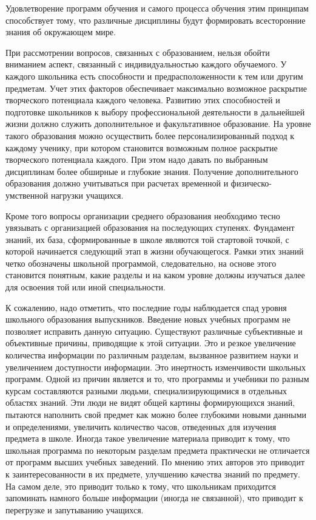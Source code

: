 Удовлетворение программ обучения и самого процесса обучения этим принципам способствует тому, что различные дисциплины будут формировать всесторонние знания об окружающем мире.

При рассмотрении вопросов, связанных с образованием, нельзя обойти вниманием аспект, связанный с индивидуальностью каждого обучаемого. У каждого школьника есть способности и предрасположенности к тем или другим предметам. Учет этих факторов обеспечивает максимально возможное раскрытие творческого потенциала каждого человека. Развитию этих способностей и подготовке школьников к выбору профессиональной деятельности в дальнейшей жизни должно служить дополнительное и факультативное образование. На уровне такого образования можно осуществить более персонализированный подход к каждому ученику, при котором становится возможным полное раскрытие творческого потенциала каждого. При этом надо давать по выбранным дисциплинам более обширные и глубокие знания. Получение дополнительного образования должно учитываться при расчетах временной и физическо-умственной нагрузки учащихся.

Кроме того вопросы организации среднего образования необходимо тесно увязывать с организацией образования на последующих ступенях. Фундамент знаний, их база, сформированные в школе являются той стартовой точкой, с которой начинается следующий этап в жизни обучающегося. Рамки этих знаний четко обозначены школьной программой, следовательно, на основе этого становится понятным, какие разделы и на каком уровне должны изучаться далее для освоения той или иной специальности.

К сожалению, надо отметить, что последние годы наблюдается спад уровня школьного образования выпускников. Введение новых учебных программ не позволяет исправить данную ситуацию. Существуют различные субъективные и объективные причины, приводящие к этой ситуации. Это и резкое увеличение количества информации по различным разделам, вызванное развитием науки и увеличением доступности информации. Это инертность изменчивости школьных программ. Одной из причин является и то, что программы и учебники по разным курсам составляются разными людьми, специализирующимися в отдельных областях знаний. Эти люди не видят общей картины формирующихся знаний, пытаются наполнить свой предмет как можно более глубокими новыми данными и определениями, увеличить количество часов, отведенных для изучения предмета в школе. Иногда такое увеличение материала приводит к тому, что школьная программа по некоторым разделам предмета практически не отличается от программ высших учебных заведений. По мнению этих авторов это приводит к заинтересованности в их предмете, улучшению качества знаний по предмету. На самом деле, это приводит только к тому, что школьникам приходится запоминать намного больше информации (иногда не связанной), что приводит к перегрузке и запутыванию учащихся.

